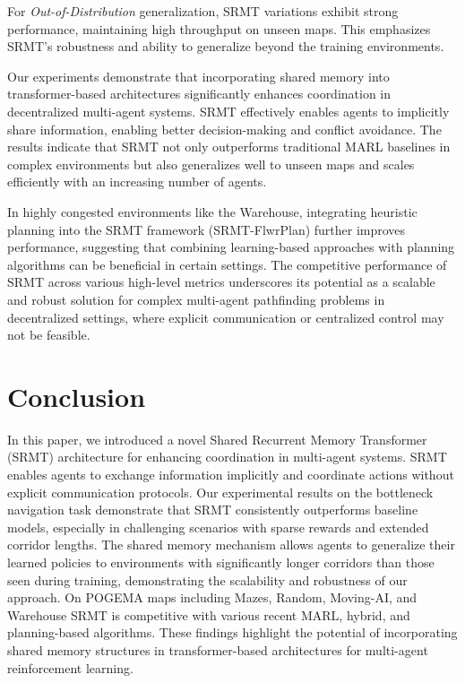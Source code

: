 \documentclass{article} %
\begin{document}
For \textit{Out-of-Distribution} generalization, SRMT variations exhibit strong performance, maintaining high throughput on unseen maps. This emphasizes SRMT's robustness and ability to generalize beyond the training environments.


Our experiments demonstrate that incorporating shared memory into transformer-based architectures significantly enhances coordination in decentralized multi-agent systems. SRMT effectively enables agents to implicitly share information, enabling better decision-making and conflict avoidance. The results indicate that SRMT not only outperforms traditional MARL baselines in complex environments but also generalizes well to unseen maps and scales efficiently with an increasing number of agents.

In highly congested environments like the Warehouse, integrating heuristic planning into the SRMT framework (SRMT-FlwrPlan) further improves performance, suggesting that combining learning-based approaches with planning algorithms can be beneficial in certain settings. The competitive performance of SRMT across various high-level metrics underscores its potential as a scalable and robust solution for complex multi-agent pathfinding problems in decentralized settings, where explicit communication or centralized control may not be feasible.




\section{Conclusion}


In this paper, we introduced a novel Shared Recurrent Memory Transformer (SRMT) architecture for enhancing coordination in multi-agent systems. SRMT enables agents to exchange information implicitly and coordinate actions without explicit communication protocols. Our experimental results on the bottleneck navigation task demonstrate that SRMT consistently outperforms baseline models, especially in challenging scenarios with sparse rewards and extended corridor lengths. The shared memory mechanism allows agents to generalize their learned policies to environments with significantly longer corridors than those seen during training, demonstrating the scalability and robustness of our approach. On POGEMA maps including Mazes, Random, Moving-AI, and Warehouse SRMT is competitive with various recent MARL, hybrid, and planning-based algorithms. These findings highlight the potential of incorporating shared memory structures in transformer-based architectures for multi-agent reinforcement learning.
\end{document}
